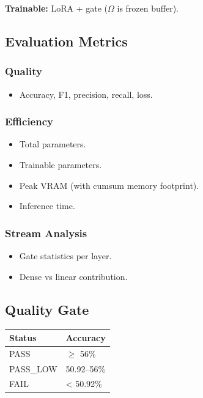 \textbf{Trainable:} LoRA + gate ($\Omega$ is frozen buffer).

\subsection{Evaluation Metrics}

\subsubsection{Quality}
\begin{itemize}
\item Accuracy, F1, precision, recall, loss.

\end{itemize}
\subsubsection{Efficiency}
\begin{itemize}
\item Total parameters.
\item Trainable parameters.
\item Peak VRAM (with cumsum memory footprint).
\item Inference time.

\end{itemize}
\subsubsection{Stream Analysis}
\begin{itemize}
\item Gate statistics per layer.
\item Dense vs linear contribution.

\end{itemize}
\subsection{Quality Gate}

\begin{table}[H]
\centering
\small
\begin{tabular}{ll}
\toprule
\textbf{Status} & \textbf{Accuracy} \\
\midrule
PASS & $\ge$ 56\% \\
PASS\_LOW & 50.92--56\% \\
FAIL & \textless{} 50.92\% \\
\bottomrule
\end{tabular}
\end{table}

